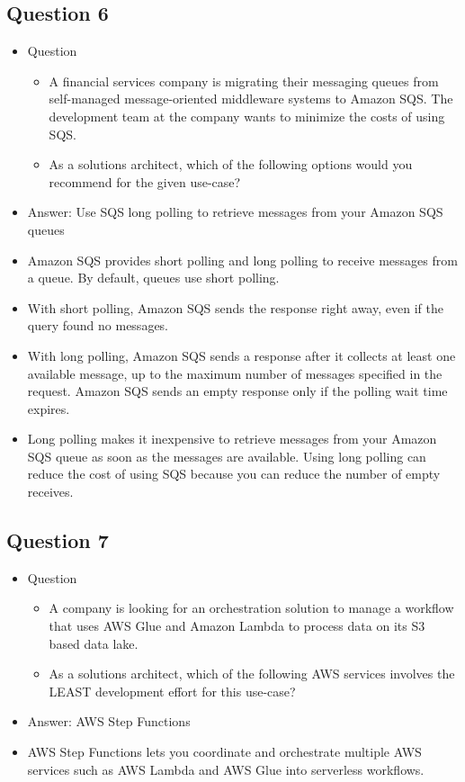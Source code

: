 \documentclass[]{scrartcl}
\begin{document}
\subsection{Question 6}
\begin{itemize}
	\item Question
	\begin{itemize}
		\item A financial services company is migrating their messaging queues from self-managed message-oriented middleware systems to Amazon SQS. The development team at the company wants to minimize the costs of using SQS.
		\item As a solutions architect, which of the following options would you recommend for the given use-case?
	\end{itemize}
	\item Answer: Use SQS long polling to retrieve messages from your Amazon SQS queues
	\item Amazon SQS provides short polling and long polling to receive messages from a queue. By default, queues use short polling. 
	\item With short polling, Amazon SQS sends the response right away, even if the query found no messages. \item With long polling, Amazon SQS sends a response after it collects at least one available message, up to the maximum number of messages specified in the request. Amazon SQS sends an empty response only if the polling wait time expires.
	\item Long polling makes it inexpensive to retrieve messages from your Amazon SQS queue as soon as the messages are available. Using long polling can reduce the cost of using SQS because you can reduce the number of empty receives.
\end{itemize}

\subsection{Question 7}
\begin{itemize}
	\item Question
	\begin{itemize}
		\item A company is looking for an orchestration solution to manage a workflow that uses AWS Glue and Amazon Lambda to process data on its S3 based data lake.
		\item As a solutions architect, which of the following AWS services involves the LEAST development effort for this use-case?
	\end{itemize}
	\item Answer: AWS Step Functions
	\item AWS Step Functions lets you coordinate and orchestrate multiple AWS services such as AWS Lambda and AWS Glue into serverless workflows. 
\end{itemize}
\end{document}
